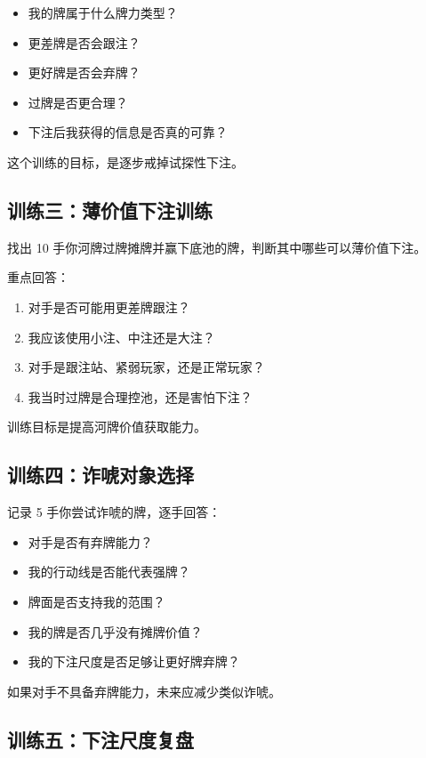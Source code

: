 \begin{itemize}
\item 我的牌属于什么牌力类型？
\item 更差牌是否会跟注？
\item 更好牌是否会弃牌？
\item 过牌是否更合理？
\item 下注后我获得的信息是否真的可靠？
\end{itemize}

这个训练的目标，是逐步戒掉试探性下注。

\subsection*{训练三：薄价值下注训练}

找出 10 手你河牌过牌摊牌并赢下底池的牌，判断其中哪些可以薄价值下注。

重点回答：

\begin{enumerate}
\item 对手是否可能用更差牌跟注？
\item 我应该使用小注、中注还是大注？
\item 对手是跟注站、紧弱玩家，还是正常玩家？
\item 我当时过牌是合理控池，还是害怕下注？
\end{enumerate}

训练目标是提高河牌价值获取能力。

\subsection*{训练四：诈唬对象选择}

记录 5 手你尝试诈唬的牌，逐手回答：

\begin{itemize}
\item 对手是否有弃牌能力？
\item 我的行动线是否能代表强牌？
\item 牌面是否支持我的范围？
\item 我的牌是否几乎没有摊牌价值？
\item 我的下注尺度是否足够让更好牌弃牌？
\end{itemize}

如果对手不具备弃牌能力，未来应减少类似诈唬。

\subsection*{训练五：下注尺度复盘}

